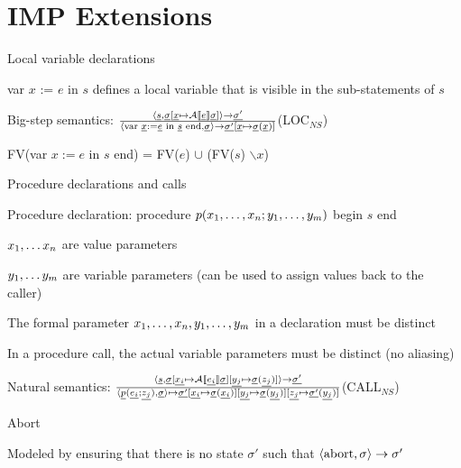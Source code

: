 \section{IMP Extensions}
\enumstart
	\item Local variable declarations
	\enumstart
		\item var $x$ := $e$ in $s$ defines a local variable that is visible in the sub-statements of $s$
		\item Big-step semantics: $\frac{\langle \underline{s}, \underline{\sigma}[\underline{x} \mapsto \mathcal{A}\llbracket \underline{e} \rrbracket \underline{\sigma}] \rangle \rightarrow \underline{\sigma'}}{\langle \text{var }\underline{x} := \underline{e} \text{ in }\underline{s}\text{ end}, \underline{\sigma} \rangle \rightarrow \underline{\sigma'}[\underline{x} \mapsto \underline{\sigma}(\underline{x})]}$(LOC$_{NS}$)
		\item FV(var $x := e$ in $s$ end) = FV($e$) $\cup$ (FV($s$) $\smallsetminus x$)
	\enumend
	\item Procedure declarations and calls
	\enumstart
		\item Procedure declaration: procedure $p(x_1, \mathellipsis, x_n; y_1, \mathellipsis, y_m)$ begin $s$ end
		\item $x_1, \mathellipsis x_n$ are value parameters
		\item $y_1, \mathellipsis y_m$ are variable parameters (can be used to assign values back to the caller)
		\item The formal parameter $x_1, \mathellipsis, x_n, y_1, \mathellipsis, y_m$ in a declaration must be distinct
		\item In a procedure call, the actual variable parameters must be distinct (no aliasing)
		\item Natural semantics: $\frac{\langle \underline{s}, \underline{\sigma}[\underline{x_i} \mapsto \mathcal{A}\llbracket \underline{e_i} \rrbracket \underline{\sigma} ][\underline{y_j} \mapsto \underline{\sigma}(\underline{z_j})] \rangle \rightarrow \underline{\sigma'}}{\langle \underline{p}(\underline{e_i}; \underline{z_j}), \underline{\sigma} \rangle \mapsto \underline{\sigma'}[\underline{x_i} \mapsto \underline{\sigma}(\underline{x_i})][\underline{y_j} \mapsto \underline{\sigma}(\underline{y_j})][\underline{z_j} \mapsto \underline{\sigma'}(\underline{y_j})]}$(CALL$_{NS}$)
	\enumend
	\item Abort
	\enumstart
		\item Modeled by ensuring that there is no state $\sigma'$ such that $\langle \text{abort}, \sigma \rangle \rightarrow \sigma'$
